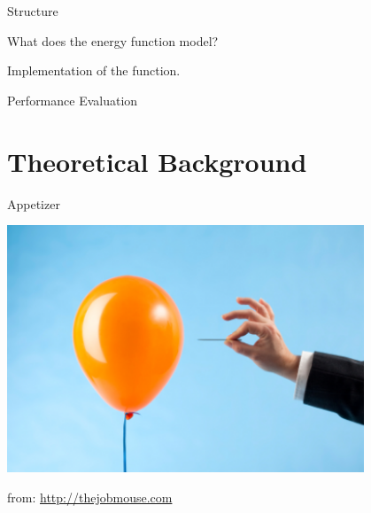 \begin{frame}{Structure}
    \begin{mdframed}[frametitle=Theoretical Background,%
            backgroundcolor=\ColorIntro]
        What does the energy function model?
    \end{mdframed}

    \begin{mdframed}[frametitle=Methods,%
            backgroundcolor=\ColorMethod]
        Implementation of the function.
    \end{mdframed}

    \begin{mdframed}[frametitle=Results,%
            backgroundcolor=\ColorResults]
        Performance Evaluation
    \end{mdframed}

    \begin{mdframed}[frametitle=Discussion,%
            backgroundcolor=\ColorDiscussion]
    \end{mdframed}
\end{frame}

\section{Theoretical Background}



\begin{frame}{Appetizer}
    \begin{center}
        \includegraphics[width=0.8\textwidth]{baloon.png}
    \end{center}
    \begin{flushright}
        \tiny
        \color{gray}from: \url{http://thejobmouse.com}
    \end{flushright}
\end{frame}

